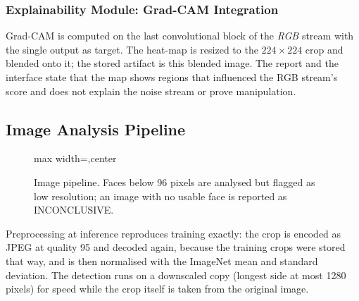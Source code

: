 \subsubsection{Explainability Module: Grad-CAM Integration}
Grad-CAM is computed on the last convolutional block of the \emph{RGB} stream with the single output as target. The heat-map is resized to the
$224\times224$ crop and blended onto it; the stored artifact is this blended image. The report and the interface state that the map shows
regions that influenced the RGB stream's score and does not explain the noise stream or prove manipulation.

\subsection{Image Analysis Pipeline}
\begin{figure}[ht]
\centering
\begin{adjustbox}{max width=\linewidth,center}
\end{adjustbox}
\caption[Image pipeline. Faces below 96 pixels are analysed but flagged as low resolution; an image]{Image pipeline. Faces below 96 pixels are analysed but flagged as low resolution; an image with no usable face is reported as
INCONCLUSIVE.}
\label{fig:imgpipe}
\end{figure}
Preprocessing at inference reproduces training exactly: the crop is encoded as JPEG at quality 95 and decoded again, because the training
crops were stored that way, and is then normalised with the ImageNet mean and standard deviation. The detection runs on a downscaled copy
(longest side at most 1280 pixels) for speed while the crop itself is taken from the original image.

